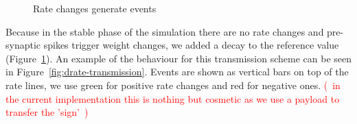 \documentclass{article}
\newcommand\note[1]{\textcolor{red}{(~#1~)}}
\begin{document}
\begin{figure}[h!bt]
\begin{subfigure}[b]{0.3\textwidth}
        \caption{}
        \label{fig:rate-changes-decay}
    \end{subfigure}
    
    \caption{Rate changes generate events}
    \label{fig:rate-chagnes}
\end{figure}

Because in the stable phase of the simulation there are no rate changes and pre-synaptic spikes trigger weight changes, we added a decay to the reference value (Figure~\ref{fig:rate-changes-decay}). 
An example of the behaviour for this transmission scheme can be seen in Figure~\ref{fig:drate-transmission}.
Events are shown as vertical bars on top of the rate lines, we use green for positive rate changes and red for negative ones. 
\note{in the current implementation this is nothing but cosmetic as we use a payload to transfer the 'sign'}
\end{document}
